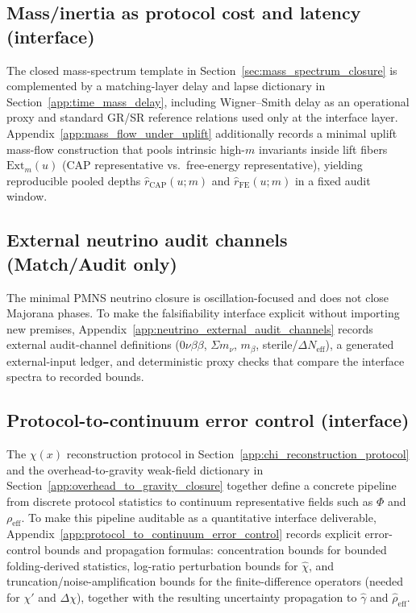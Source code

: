 \subsection{Mass/inertia as protocol cost and latency (interface)}
The closed mass-spectrum template in Section~\ref{sec:mass_spectrum_closure} is complemented by a matching-layer delay and lapse dictionary in Section~\ref{app:time_mass_delay}, including Wigner--Smith delay as an operational proxy and standard GR/SR reference relations used only at the interface layer.
Appendix~\ref{app:mass_flow_under_uplift} additionally records a minimal uplift mass-flow construction that pools intrinsic high-$m$ invariants inside lift fibers $\mathrm{Ext}_m(u)$ (CAP representative vs.\ free-energy representative), yielding reproducible pooled depths $\widehat r_{\mathrm{CAP}}(u;m)$ and $\widehat r_{\mathrm{FE}}(u;m)$ in a fixed audit window.

\subsection{External neutrino audit channels (Match/Audit only)}
The minimal PMNS neutrino closure is oscillation-focused and does not close Majorana phases.
To make the falsifiability interface explicit without importing new premises, Appendix~\ref{app:neutrino_external_audit_channels} records external audit-channel definitions (0$\nu\beta\beta$, $\Sigma m_\nu$, $m_\beta$, sterile/$\Delta N_\mathrm{eff}$), a generated external-input ledger, and deterministic proxy checks that compare the interface spectra to recorded bounds.

\subsection{Protocol-to-continuum error control (interface)}
The $\chi(x)$ reconstruction protocol in Section~\ref{app:chi_reconstruction_protocol} and the overhead-to-gravity weak-field dictionary in Section~\ref{app:overhead_to_gravity_closure} together define a concrete pipeline from discrete protocol statistics to continuum representative fields such as $\Phi$ and $\rho_{\mathrm{eff}}$.
To make this pipeline auditable as a quantitative interface deliverable, Appendix~\ref{app:protocol_to_continuum_error_control} records explicit error-control bounds and propagation formulas:
concentration bounds for bounded folding-derived statistics, log-ratio perturbation bounds for $\widehat\chi$, and truncation/noise-amplification bounds for the finite-difference operators (needed for $\chi'$ and $\Delta\chi$), together with the resulting uncertainty propagation to $\widehat\gamma$ and $\widehat\rho_{\mathrm{eff}}$.



